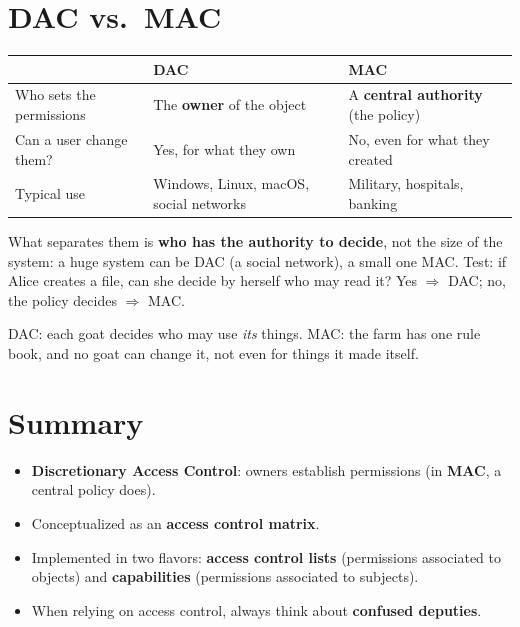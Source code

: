 \section{DAC vs.\ MAC}

\begin{center}
\begin{tabularx}{\linewidth}{@{}l X X@{}}
\toprule
 & \textbf{DAC} & \textbf{MAC} \\
\midrule
Who sets the permissions & The \textbf{owner} of the object & A \textbf{central authority} (the policy) \\
Can a user change them?  & Yes, for what they own         & No, even for what they created \\
Typical use & Windows, Linux, macOS, social networks & Military, hospitals, banking \\
\bottomrule
\end{tabularx}
\end{center}

\begin{rembox}[title=It is not a question of scale]
What separates them is \textbf{who has the authority to decide}, not the size of the
system: a huge system can be DAC (a social network), a small one MAC. Test: if Alice
creates a file, can she decide by herself who may read it? Yes $\Rightarrow$ DAC; no,
the policy decides $\Rightarrow$ MAC.
\end{rembox}

\begin{goatbox}
DAC: each goat decides who may use \emph{its} things. MAC: the farm has one rule book, and no goat
can change it, not even for things it made itself.
\end{goatbox}

\section{Summary}

\begin{keybox}[title=Summary]
\begin{itemize}
  \item \textbf{Discretionary Access Control}: owners establish permissions (in
        \textbf{MAC}, a central policy does).
  \item Conceptualized as an \textbf{access control matrix}.
  \item Implemented in two flavors: \textbf{access control lists} (permissions
        associated to objects) and \textbf{capabilities} (permissions associated to
        subjects).
  \item When relying on access control, always think about \textbf{confused deputies}.
\end{itemize}
\end{keybox}


